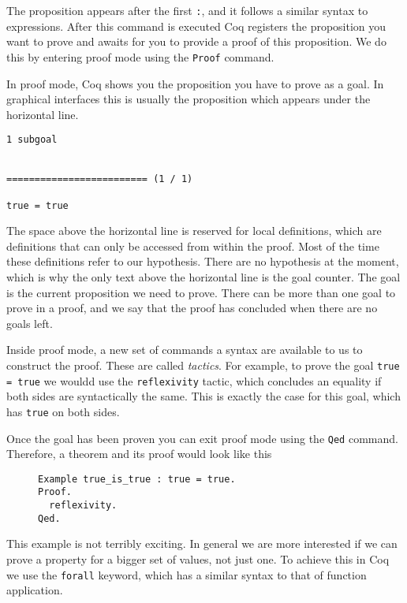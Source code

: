 The proposition appears after the first \texttt{:}, and it follows a similar syntax to 
expressions. %
After this command is executed Coq registers the proposition you want to prove and awaits for you
to provide a proof of this proposition. We do this by entering proof mode using the 
\texttt{Proof} command.

In proof mode, Coq shows you the proposition you have to prove as a goal. In graphical interfaces this
is usually the proposition which appears under the horizontal line.

\begin{verbatim}
1 subgoal


========================= (1 / 1)

true = true
\end{verbatim}

The space above the horizontal line is reserved for local definitions, which are definitions that can
only be accessed from within the proof. Most of the time these definitions refer to our hypothesis. There
are no hypothesis at the moment, which is why the only text above the horizontal line is the goal counter.
The goal is the current proposition we need to prove. There can be more than one goal to prove in a proof,
and we say that the proof has concluded when there are no goals left.

Inside proof mode, a new set of commands a syntax are available to us to construct the proof. These are
called \emph{tactics}. For example, to prove the goal \texttt{true = true} we wouldd use the 
\texttt{reflexivity} tactic, which concludes an equality if both sides are syntactically the same. This is
exactly the case for this goal, which has \texttt{true} on both sides.

Once the goal has been proven you can exit proof mode using the \texttt{Qed} command. Therefore,
a theorem and its proof would look like this

\begin{figure}[!ht]
\begin{verbatim}
Example true_is_true : true = true.
Proof.
  reflexivity.
Qed.
\end{verbatim}
\label{lst:true-is-true}
\end{figure}

This example is not terribly exciting. In general we are more interested if we can prove a property for a
bigger set of values, not just one. To achieve this in Coq we use the \texttt{forall} 
keyword, which has a similar syntax to that of function application.

